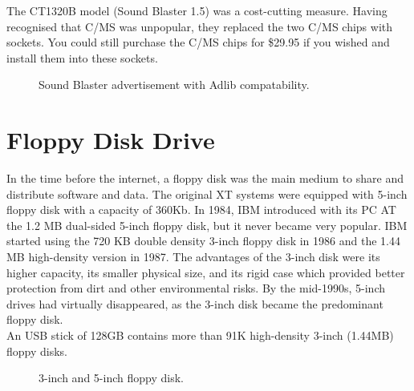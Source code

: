 \documentclass[book.tex]{subfiles}
\begin{document}
\par
   The CT1320B model (Sound Blaster 1.5) was a cost-cutting measure. Having recognised that C/MS was unpopular, they replaced the two C/MS chips with sockets. You could still purchase the C/MS chips for \$29.95 if you wished and install them into these sockets.\\
  


\begin{figure}[H] 
  \centering 
  \caption{Sound Blaster advertisement with Adlib compatability.}
  \label{asb15_advertise}
\end{figure}


  
  

\section{Floppy Disk Drive}
In the time before the internet, a floppy disk was the main medium to share and distribute software and data. The original XT systems were equipped with 5-inch floppy disk with a capacity of 360Kb. In 1984, IBM introduced with its PC AT the 1.2 MB dual-sided 5-inch floppy disk, but it never became very popular. IBM started using the 720 KB double density 3-inch floppy disk in 1986 and the 1.44 MB high-density version in 1987. The advantages of the 3-inch disk were its higher capacity, its smaller physical size, and its rigid case which provided better protection from dirt and other environmental risks. By the mid-1990s, 5-inch drives had virtually disappeared, as the 3-inch disk became the predominant floppy disk. \\

\vspace{10pt}
 An USB stick of 128GB contains more than 91K high-density 3-inch (1.44MB) floppy disks.\\
\par

\begin{figure}[H]

  \begin{minipage}{0.48\textwidth}
  \centering
  \end{minipage}
  \hfill
  \begin{minipage}{0.48\textwidth}
  \centering
  \end{minipage}
  \caption{3-inch and 5-inch floppy disk.}
  \end{figure}
\par
\end{document}

